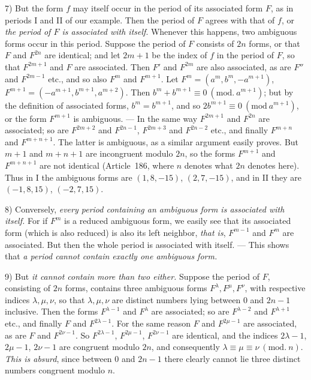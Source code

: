 7) But the form $f$ may itself occur in the period of its associated form $F$, as in periods I and II of our example. Then the period of $F$ agrees with that of $f$, or \textit{the period of $F$ is associated with itself}. Whenever this happens, two ambiguous forms occur in this period. Suppose the period of $F$ consists of $2n$ forms, or that $F$ and $F^{2n}$ are identical; and let $2m+1$ be the index of $f$ in the period of $F$, so that $F^{2m+1}$ and $F$ are associated. Then $F'$ and $F^{2m}$ are also associated, as are $F''$ and $F^{2m-1}$ etc., and so also $F^m$ and $F^{m+1}$. Let $F^m=(a^m,b^m,-a^{m+1})$, $F^{m+1}=(-a^{m+1},b^{m+1},a^{m+2})$. Then $b^m+b^{m+1}\equiv0\ (\mathrm{mod.}\ a^{m+1})$; but by the definition of associated forms, $b^m=b^{m+1}$, and so $2b^{m+1}\equiv0\ (\mathrm{mod}\ a^{m+1})$, or the form $F^{m+1}$ is ambiguous. --- In the same way $F^{2m+1}$ and $F^{2n}$ are associated; so are $F^{2m+2}$ and $F^{2n-1}$, $F^{2m+3}$ and $F^{2n-2}$ etc., and finally $F^{m+n}$ and $F^{m+n+1}$. The latter is ambiguous, as a similar argument easily proves. But $m+1$ and $m+n+1$ are incongruent modulo $2n$, so the forms $F^{m+1}$ and $F^{m+n+1}$ are not identical (Article~186, where $n$ denotes what $2n$ denotes here). Thus in I the ambiguous forms are $(1,8,-15)$, $(2,7,-15)$, and in II they are $(-1,8,15)$, $(-2,7,15)$.

8) Conversely, \textit{every period containing an ambiguous form is associated with itself.} For if $F^m$ is a reduced ambiguous form, we easily see that its associated form (which is also reduced) is also its left neighbor, \textit{that is}, $F^{m-1}$ and $F^m$ are associated. But then the whole period is associated with itself. --- This shows that \textit{a period cannot contain exactly one ambiguous form.}

9) But \textit{it cannot contain more than two either.} Suppose the period of $F$, consisting of $2n$ forms, contains three ambiguous forms $F^\lambda,F^\mu,F^\nu$, with respective indices $\lambda,\mu,\nu$, so that $\lambda,\mu,\nu$ are distinct numbers lying between $0$ and $2n-1$ inclusive. Then the forms $F^{\lambda-1}$ and $F^\lambda$ are associated; so are $F^{\lambda-2}$ and $F^{\lambda+1}$ etc., and finally $F$ and $F^{2\lambda-1}$. For the same reason $F$ and $F^{2\mu-1}$ are associated, as are $F$ and $F^{2\nu-1}$. So $F^{2\lambda-1}$, $F^{2\mu-1}$, $F^{2\nu-1}$ are identical, and the indices $2\lambda-1$, $2\mu-1$, $2\nu-1$ are congruent modulo $2n$, and consequently $\lambda\equiv\mu\equiv\nu\ (\mathrm{mod.}\ n)$. \textit{This is absurd}, since between $0$ and $2n-1$ there clearly cannot lie three distinct numbers congruent modulo $n$.
